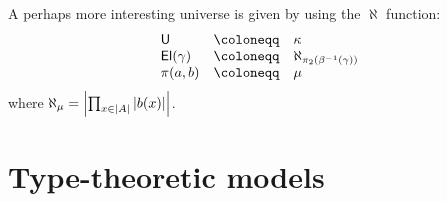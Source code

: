 A perhaps more interesting universe is given by using the \(\aleph\) function:
\[
  \begin{array}{lcl}
    \CU &\coloneqq& \kappa \\
    \CEl(\gamma) &\coloneqq& \aleph_{\pi_2(\beta^{-1}(\gamma))} \\
    \pi(a,b) &\coloneqq& \mu
  \end{array}
\]
where \(\aleph_\mu = \left|\prod_{x \in \left|A\right|} \left|b(x)\right|\right|\).

\section{Type-theoretic models}


